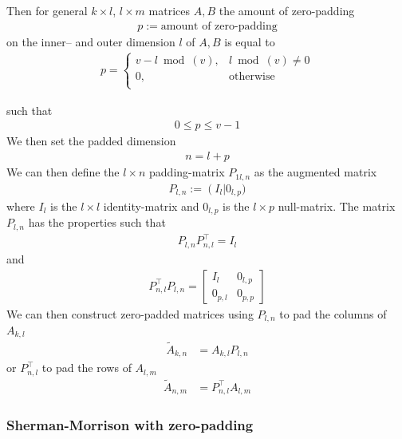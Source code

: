 \documentclass[11pt]{article}
\numberwithin{figure}{section}
\numberwithin{table}{section}
\begin{document}
Then for general $k\times l$, $l\times m $ matrices $A,B$ the amount of zero-padding 
\begin{align}
	p := \text{amount of zero-padding}
\end{align} 
on the inner-- and outer dimension $l$ of $A,B$ is equal to
\begin{align}
p= \left\{
\begin{array}{ll}
      v-l\bmod(v), & l\bmod(v)\neq0 \\
      0, & \text{otherwise}\\
\end{array} 
\right.	
\end{align}

such that
\begin{align}
	0 \leq p \leq v-1
\end{align}
We then set the padded dimension
\begin{align}
n = l + p
\end{align}
We can then define the $l\times n$ padding-matrix $P_{1l,n}$ as the augmented matrix
\begin{align}
	P_{l,n} := \left(I_l\right|0_{l,p})
\end{align}
where $I_l$ is the $l\times l$ identity-matrix and $0_{l,p}$ is the $l\times p$ null-matrix.
The matrix $P_{l,n}$ has the properties such that
\begin{align}
	P_{l,n}P^\top _{n,l}=I_l
\end{align}
and
\begin{align}
	P^\top _{n,l}P_{l,n}=
	\begin{bmatrix}
			I_l & 0_{l,p} \\
			0_{p,l} & 0_{p,p}
\end{bmatrix}
\end{align}
We can then construct zero-padded matrices using $P_{l,n}$ to pad the columns of $A_{k,l}$
\begin{align}
	\widetilde{A}_{k,n} &= A_{k,l}P_{l,n}
\end{align}
or $P^\top_{n,l}$ to pad the rows of $A_{l,m}$
\begin{align}
	\widetilde{A}_{n,m} &= P^\top_{n,l}A_{l,m}
\end{align}

\subsubsection{Sherman-Morrison with zero-padding}
\end{document}
